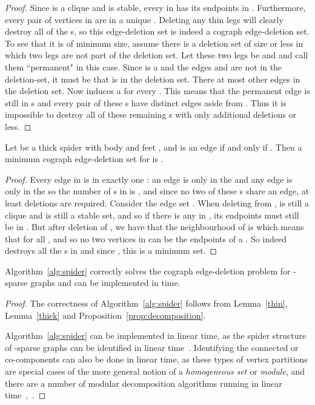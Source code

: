 \documentclass{llncs}
\begin{document}
\begin{proof}
  Since  is a clique and  is stable, every  in  has its endpoints in . Furthermore, every pair of vertices in  are in a unique . Deleting any  thin legs will clearly destroy all of the s, so this edge-deletion set is indeed a cograph edge-deletion set. To see that it is of minimum size, assume there is a deletion set of size  or less in which two legs are not part of the deletion set. Let these two legs be  and  and call them ``permanent" in this case. Since  is a  and the edges  and  are not in the deletion-set, it must be that  is in the deletion set. There at most  other edges in the deletion set. Now  induces a  for every . This means that the permanent edge  is still in  s and every pair of these s have distinct edges aside from . Thus it is impossible to destroy all of these remaining s with only  additional deletions or less.
  \hfill 
\end{proof}

\begin{lemma} \label{thick}
  Let  be a thick spider with body  and feet , and  is an edge if and only if . Then a minimum cograph edge-deletion set for  is .
\end{lemma}

\begin{proof}
 Every edge in  is in exactly one : an edge  is only in the   and any edge  is only in the   so the number of s in  is , and since no two of these s share an edge, at least  deletions are required. Consider the edge set . When deleting  from ,  is still a clique and  is still a stable set, and so if there is any  in , its endpoints must still be in . But after deletion of , we have that the neighbourhood of  is  which means that  for all , and so no two vertices in  can be the endpoints of a . So  indeed destroys all the s in  and since , this is a minimum set.
\hfill 
\end{proof}

\begin{theorem}
 Algorithm~\ref{alg:spider} correctly solves the cograph edge-deletion problem for -sparse graphs and can be implemented in  time.
\end{theorem}

\begin{proof}
 The correctness of Algorithm~\ref{alg:spider} follows from Lemma~\ref{thin}, Lemma~\ref{thick} and Proposition~\ref{prop:decomposition}.

 Algorithm~\ref{alg:spider} can be implemented in linear time, as the spider structure of -sparse graphs can be identified in linear time~\cite{JaOl}. Identifying the connected or co-components can also be done in linear time, as these types of vertex partitions are special cases of the more general notion of a \emph{homogeneous set} or \emph{module}, and there are a number of modular decomposition algorithms running in linear time~\cite{McCSp},~\cite{CoHa}.
\hfill 
\end{proof}
\end{document}
